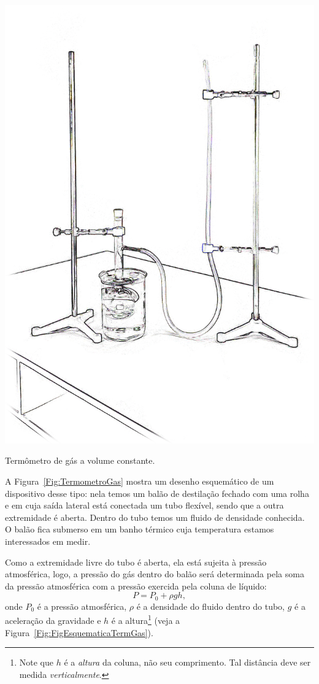 \begin{marginfigure}
\centering
\includegraphics[width=\textwidth]{Ilustrations/Term_gas.png}
\caption{Termômetro de gás a volume constante.\label{Fig:TermometroGas}}
\end{marginfigure}

A Figura~\ref{Fig:TermometroGas} mostra um desenho esquemático de um dispositivo desse tipo: nela temos um balão de destilação fechado com uma rolha e em cuja saída lateral está conectada um tubo flexível, sendo que a outra extremidade é aberta. Dentro do tubo temos um fluido de densidade conhecida. O balão fica submerso em um banho térmico cuja temperatura estamos interessados em medir.

Como a extremidade livre do tubo é aberta, ela está sujeita à pressão atmosférica, logo, a pressão do gás dentro do balão será determinada pela soma da pressão atmosférica com a pressão exercida pela coluna de líquido:
\begin{equation}\label{Eq:PressaoColunaFluido}
	P = P_0 + \rho g h,
\end{equation}
%
onde $P_0$ é a pressão atmosférica, $\rho$ é a densidade do fluido dentro do tubo, $g$ é a aceleração da gravidade e $h$ é a altura\footnote{Note que $h$ é a \emph{altura} da coluna, não seu comprimento. Tal distância deve ser medida \emph{verticalmente}.} (veja a Figura~\ref{Fig:FigEsquematicaTermGas}).

